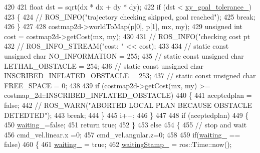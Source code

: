\begin{DoxyCode}
{420 
421         \textcolor{keywordtype}{float} dst = sqrt(dx * dx + dy * dy);
422         \textcolor{keywordflow}{if} (dst < \hyperlink{classmove__base__z__client_1_1forward__local__planner_1_1ForwardLocalPlanner_a462f6c9011e538965326add2dfb7529d}{xy\_goal\_tolerance\_})
423          \{
424             \textcolor{comment}{//  ROS\_INFO("trajectory checking skipped, goal reached");}
425              \textcolor{keywordflow}{break};
426         \}
427 
428         costmap2d->worldToMap(p[0], p[1], mx, my);
429         \textcolor{keywordtype}{unsigned} \textcolor{keywordtype}{int} cost = costmap2d->getCost(mx, my);
430 
431         \textcolor{comment}{// ROS\_INFO("checking cost pt %
432         \textcolor{comment}{// ROS\_INFO\_STREAM("cost: " << cost);}
433 
434         \textcolor{comment}{// static const unsigned char NO\_INFORMATION = 255;}
435         \textcolor{comment}{// static const unsigned char LETHAL\_OBSTACLE = 254;}
436         \textcolor{comment}{// static const unsigned char INSCRIBED\_INFLATED\_OBSTACLE = 253;}
437         \textcolor{comment}{// static const unsigned char FREE\_SPACE = 0;}
438 
439         \textcolor{keywordflow}{if} (costmap2d->getCost(mx, my) >= costmap\_2d::INSCRIBED\_INFLATED\_OBSTACLE)
440         \{
441             aceptedplan = \textcolor{keyword}{false};
442             \textcolor{comment}{// ROS\_WARN("ABORTED LOCAL PLAN BECAUSE OBSTACLE DETEDTED");}
443             \textcolor{keywordflow}{break};
444         \}
445         i++;
446     \}
447 
448     \textcolor{keywordflow}{if} (aceptedplan)
449     \{
450         \hyperlink{classmove__base__z__client_1_1forward__local__planner_1_1ForwardLocalPlanner_ab1df0eeecba67bfd070f995700b7bde4}{waiting\_}=\textcolor{keyword}{false};
451         \textcolor{keywordflow}{return} \textcolor{keyword}{true};
452     \}
453     \textcolor{keywordflow}{else}
454     \{
455         \textcolor{comment}{// stop and wait}
456         cmd\_vel.linear.x =0;
457         cmd\_vel.angular.z=0;
458 
459         \textcolor{keywordflow}{if}(\hyperlink{classmove__base__z__client_1_1forward__local__planner_1_1ForwardLocalPlanner_ab1df0eeecba67bfd070f995700b7bde4}{waiting\_} == \textcolor{keyword}{false})
460         \{
461             \hyperlink{classmove__base__z__client_1_1forward__local__planner_1_1ForwardLocalPlanner_ab1df0eeecba67bfd070f995700b7bde4}{waiting\_} = \textcolor{keyword}{true};
462             \hyperlink{classmove__base__z__client_1_1forward__local__planner_1_1ForwardLocalPlanner_a20c2ea0e1ea6ebe9a647898f34d8cbc1}{waitingStamp\_} = ros::Time::now();
}}
\end{DoxyCode}
